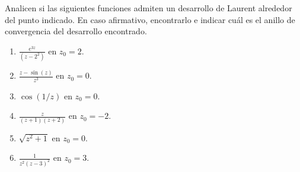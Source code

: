 \documentclass{article}
\newenvironment{theorem}[2][Ejercicio]{\begin{trivlist}
\item[\hskip\labelsep{\bfseries #1}\hskip\labelsep{\bfseries #2.}]}{\end{trivlist}}
\begin{document}
\vspace{0.25in}

\begin{theorem}{9}
    Analicen si las siguientes funciones admiten un desarrollo de Laurent alrededor del punto indicado. En caso
    afirmativo, encontrarlo e indicar cuál es el anillo de convergencia del desarrollo encontrado.
    \begin{enumerate}
        \item \( \frac{e^{3z}}{(z-2^2)} \) en \( z_0 = 2 \).
        \item \( \frac{z - \sin(z)}{z^3} \) en \( z_0 = 0 \).
        \item \( \cos(1/z) \) en \( z_0 = 0 \).
        \item \( \frac{z}{(z+1)(z+2)} \) en \( z_0 = -2 \).
        \item \( \sqrt{z^2 + 1} \) en \( z_0 = 0 \).
        \item \( \frac{1}{z^2 {(z-3)}^2} \) en \( z_0 = 3 \).
    \end{enumerate}
\end{theorem}
\end{document}
